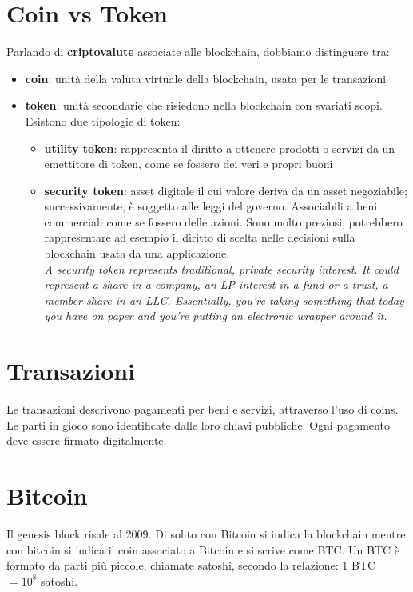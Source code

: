 \section{Coin vs Token}
Parlando di \textbf{criptovalute} associate alle blockchain, dobbiamo distinguere tra:
\begin{itemize}
    \item \textbf{coin}: unità della valuta virtuale della blockchain, usata per le transazioni
    \item \textbf{token}: unità secondarie che risiedono nella blockchain con svariati scopi. Esistono due tipologie di token:
    \begin{itemize}
        \item \textbf{utility token}: rappresenta il diritto a ottenere prodotti o servizi da un emettitore di token, come se fossero dei veri e propri buoni
        \item \textbf{security token}: asset digitale il cui valore deriva da un asset negoziabile; successivamente, è soggetto alle leggi del governo. Associabili a beni commerciali come se fossero delle azioni. Sono molto preziosi, potrebbero rappresentare ad esempio il diritto di scelta nelle decisioni sulla blockchain usata da una applicazione.\\
        
        \emph{A security token represents traditional, private security interest.
It could represent a share in a company, an LP interest in a fund
or a trust, a member share in an LLC. Essentially, you’re taking
something that today you have on paper and you’re putting an
electronic wrapper around it.}
    \end{itemize}
\end{itemize}


\section{Transazioni}
Le transazioni descrivono pagamenti per beni e servizi, attraverso l'uso di coins. Le parti in gioco sono identificate dalle loro chiavi pubbliche. Ogni pagamento deve essere firmato digitalmente. 


\section{Bitcoin}
Il genesis block risale al 2009. Di solito con Bitcoin si indica la blockchain mentre con bitcoin si indica il coin associato a Bitcoin e si scrive come BTC. Un BTC è formato da parti più piccole, chiamate satoshi, secondo la relazione: 1 BTC $= 10^8$ satoshi. 

